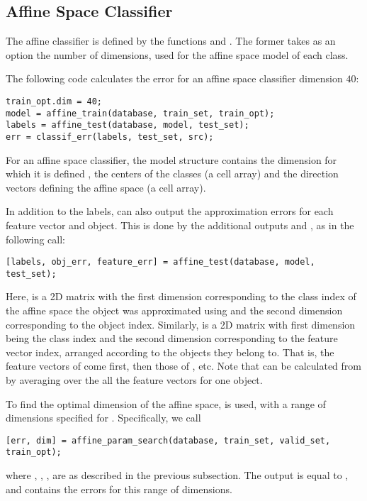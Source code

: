 \documentclass{article}
\begin{document}
\subsection{Affine Space Classifier}

The affine classifier is defined by the functions  and . The former takes as an option the number of dimensions,  used for the affine space model of each class. 

The following code calculates the error for an affine space classifier dimension $40$:
\begin{lstlisting}
train_opt.dim = 40;
model = affine_train(database, train_set, train_opt);
labels = affine_test(database, model, test_set);
err = classif_err(labels, test_set, src);
\end{lstlisting}

For an affine space classifier, the model structure contains the dimension for which it is defined , the centers of the classes  (a cell array) and the direction vectors defining the affine space  (a cell array).

In addition to the labels,  can also output the approximation errors for each feature vector and object. This is done by the additional outputs  and , as in the following call:
\begin{lstlisting}
[labels, obj_err, feature_err] = affine_test(database, model, test_set);
\end{lstlisting}
Here,  is a 2D matrix with the first dimension corresponding to the class index of the affine space the object was approximated using and the second dimension corresponding to the object index. Similarly,  is a 2D matrix with first dimension being the class index and the second dimension corresponding to the feature vector index, arranged according to the objects they belong to. That is, the feature vectors of  come first, then those of , etc. Note that  can be calculated from  by averaging over the all the feature vectors for one object.

To find the optimal dimension of the affine space,  is used, with a range of dimensions specified for . Specifically, we call
\begin{lstlisting}
[err, dim] = affine_param_search(database, train_set, valid_set, train_opt);
\end{lstlisting}
where , , ,  are as described in the previous subsection. The output  is equal to , and  contains the errors for this range of dimensions.
\end{document}
